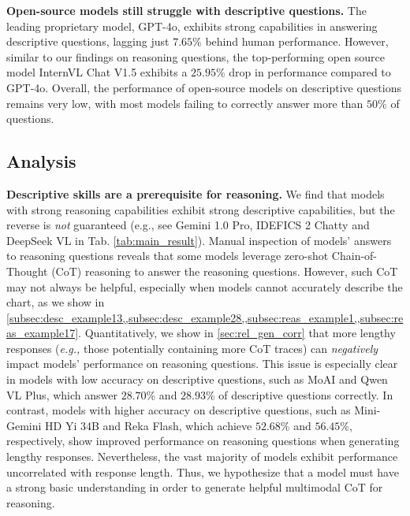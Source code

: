 \textbf{Open-source models still struggle with descriptive questions.  }
The leading proprietary model, GPT-4o, exhibits strong capabilities in answering descriptive questions, lagging just $7.65\%$ behind human performance.
However, similar to our findings on reasoning questions, the top-performing open source model InternVL Chat V1.5 exhibits a $25.95\%$ drop in performance compared to GPT-4o.
Overall, the performance of open-source models on descriptive questions remains very low, with most models failing to correctly answer more than $50$\% of questions.

\subsection{Analysis}
\label{subsec:exp_analysis}

\textbf{Descriptive skills are a prerequisite for reasoning.  }
We find that models with strong reasoning capabilities exhibit strong descriptive capabilities, but the reverse is \emph{not} guaranteed (e.g., see Gemini 1.0 Pro, IDEFICS 2 Chatty and DeepSeek VL in Tab. \ref{tab:main_result}).
Manual inspection of models' answers to reasoning questions reveals that some models \cite{rekateam2024reka, li2024minigemini, bai2023qwenvl, lee2024moai} leverage zero-shot Chain-of-Thought (CoT) reasoning \cite{wei2022chain, zhang2023multimodal} to answer the reasoning questions.
However, such CoT may not always be helpful, especially when models cannot accurately describe the chart, as we show in \cref{subsec:desc_example13,,subsec:desc_example28,,subsec:reas_example1,,subsec:reas_example17}.
Quantitatively, we show in \cref{sec:rel_gen_corr} that more lengthy responses (\textit{e.g.,} those potentially containing more CoT traces) can \textit{negatively} impact models' performance on reasoning questions. 
This issue is especially clear in models with low accuracy on descriptive questions, such as MoAI and Qwen VL Plus, which answer $28.70$\% and $28.93$\% of descriptive questions correctly.
In contrast, models with higher accuracy on descriptive questions, such as Mini-Gemini HD Yi 34B and Reka Flash, which achieve $52.68$\% and $56.45$\%, respectively, show improved performance on reasoning questions when generating lengthy responses.
Nevertheless, the vast majority of models exhibit performance uncorrelated with response length.
Thus, we hypothesize that a model must have a strong basic understanding in order to generate helpful multimodal CoT for reasoning.

